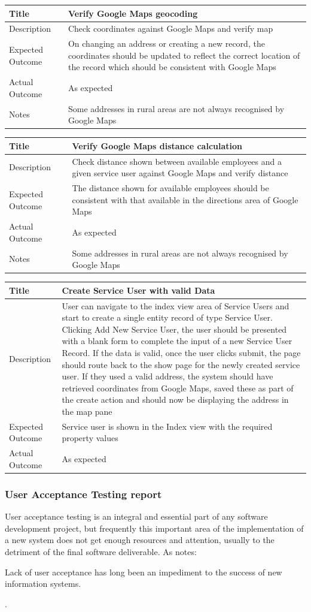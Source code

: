 \documentclass[a4paper,Times New Roman 11pt]{article}
\newcommand\addrow[2]{#1 &#2\\ }
\newcommand\addheading[2]{#1 &#2\\ \hline}
\newcommand\tabularhead{\begin{tabular}{lp{9cm}}
\hline
}
\newenvironment{usecase}{\tabularhead}
{\hline\end{tabular}}
\begin{document}
\begin{usecase}
    \addheading{Title}{Verify Google Maps geocoding}
  \addheading{Description}{Check coordinates against Google Maps and verify map}
  \addrow{Expected Outcome}{ On changing an address or creating a new record, the coordinates should be updated to reflect the correct location of the record which should be consistent with Google Maps}
  \addrow{Actual Outcome}{As expected}
 \addrow{Notes}{Some addresses in rural areas are not always recognised by Google Maps}
\end{usecase}
 
\begin{usecase}
    \addheading{Title}{Verify Google Maps distance calculation}
  \addheading{Description}{Check distance shown between available employees and a given service user against Google Maps and verify distance}
  \addrow{Expected Outcome}{ The distance shown for available employees should be consistent with that available in the directions area of Google Maps}
  \addrow{Actual Outcome}{As expected}
 \addrow{Notes}{Some addresses in rural areas are not always recognised by Google Maps}
\end{usecase}

\begin{usecase}
    \addheading{Title}{Create Service User with valid Data}
  \addheading{Description}{User can navigate to the index view area of Service Users and start to create a single entity record of type Service User. Clicking Add New Service User, the user should be presented with a blank form to complete the input of a new Service User Record. If the data is valid, once the user clicks submit, the page should route back to the show page for the newly created service user. If they used a valid address, the system should have retrieved coordinates from Google Maps, saved these as part of the create action and should now be displaying the address in the map pane}
  \addrow{Expected Outcome}{Service user is shown in the Index view with the required property values}
  \addrow{Actual Outcome}{As expected}
\end{usecase}


\subsubsection{User Acceptance Testing report}
User acceptance testing is an integral and essential part of any software development project, but frequently this important area of the implementation of a new system does not get enough resources and attention, usually to the detriment of the  final software deliverable. As \parencite{davis} notes:
\begin{displayquote}
Lack of user acceptance has long been an impediment to the success of new information systems.
\end{displayquote}.
\end{document}
